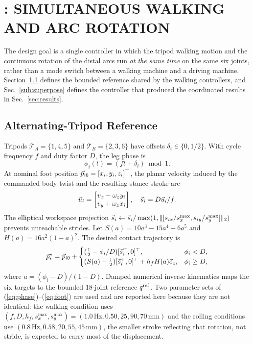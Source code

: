 \section{\gaitname{}: SIMULTANEOUS WALKING AND ARC ROTATION}

The design goal is a single controller in which the tripod walking motion and
the continuous rotation of the distal arcs run \emph{at the same time} on the
same six joints, rather than a mode switch between a walking machine and a
driving machine. Section~\ref{sub:tripod} defines the bounded reference shared by
the walking controllers, and Sec.~\ref{sub:superpose} defines the controller that
produced the coordinated results in Sec.~\ref{sec:results}.

\subsection{Alternating-Tripod Reference}\label{sub:tripod}

Tripods $\mathcal{T}_A=\{1,4,5\}$ and $\mathcal{T}_B=\{2,3,6\}$ have offsets
$\delta_i\in\{0,1/2\}$. With cycle frequency $f$ and duty factor $D$, the leg
phase is
\begin{equation}
 \phi_i(t)=(ft+\delta_i)\bmod 1.                               \label{eq:phase}
\end{equation}
At nominal foot position $\vec{p}_{i0}=[x_i,y_i,z_i]^\top$, the planar velocity
induced by the commanded body twist and the resulting stance stroke are
\begin{equation}
 \vec{u}_i=\begin{bmatrix}v_x-\omega_zy_i\\v_y+\omega_zx_i\end{bmatrix},
 \quad \vec{s}_i=D\vec{u}_i/f.                              \label{eq:stroke}
\end{equation}
The elliptical workspace projection $\vec{s}_i\leftarrow\vec{s}_i/
\max(1,\|[s_{ix}/s_x^{\max},s_{iy}/s_y^{\max}]\|_2)$ prevents unreachable
strides. Let $S(a)=10a^3-15a^4+6a^5$ and $H(a)=16a^2(1-a)^2$. The desired contact
trajectory is
\begin{equation}
 \vec{p}_i^\star=\vec{p}_{i0}+\begin{cases}
 (\tfrac12-\phi_i/D)[\vec{s}_i^\top,0]^\top,&\phi_i<D,\\
 (S(a)-\tfrac12)[\vec{s}_i^\top,0]^\top+h_fH(a)\vec{e}_z,&\phi_i\ge D,
 \end{cases}                                                   \label{eq:foot}
\end{equation}
where $a=(\phi_i-D)/(1-D)$. Damped numerical inverse kinematics maps the six
targets to the bounded 18-joint reference $\vec{q}^{\rm ref}$. Two parameter
sets of (\ref{eq:phase})--(\ref{eq:foot}) are used and are reported here because
they are not identical: the walking condition uses
$(f,D,h_f,s_x^{\max},s_y^{\max})=(1.0\,\mathrm{Hz},0.50,25,90,70\,\mathrm{mm})$
and the rolling conditions use $(0.8\,\mathrm{Hz},0.58,20,55,45\,\mathrm{mm})$,
the smaller stroke reflecting that rotation, not stride, is expected to carry
most of the displacement.

